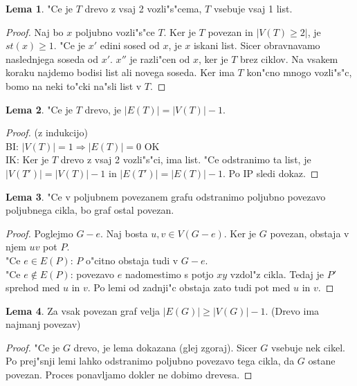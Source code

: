 \documentclass{article}
\theoremstyle{definition}
\newtheorem{lemma}{Lema}[section]
\begin{document}
	\begin{lemma}
		"Ce je $T$ drevo z vsaj 2 vozli"s"cema, $T$ vsebuje vsaj 1 list.
		\begin{proof}
			Naj bo $x$ poljubno vozli"s"ce $T$. Ker je $T$ povezan in $|V(T) \geq 2|$, je $st(x) \geq 1$. "Ce je $x'$ edini sosed od $x$, je $x$ iskani list. Sicer obravnavamo naslednjega soseda od $x'$. $x''$ je razli"cen od $x$, ker je $T$ brez ciklov. Na vsakem koraku najdemo bodisi list ali novega soseda. Ker ima $T$ kon"cno mnogo vozli"s"c, bomo na neki to"cki na"sli list v $T$.
		\end{proof}
	\end{lemma}
	\begin{lemma}
		"Ce je $T$ drevo, je $|E(T)| = |V(T)| - 1$.
		\begin{proof} (z indukcijo) \\
			BI: $|V(T)| = 1 \Rightarrow |E(T)| = 0$ OK \\
			IK:
			Ker je $T$ drevo z vsaj 2 vozli"s"ci, ima list. "Ce odstranimo ta list, je $|V(T')| = |V(T)| - 1$ in $|E(T')| = |E(T)| - 1$. Po IP sledi dokaz.
		\end{proof}
	\end{lemma}
	\begin{lemma}
		"Ce v poljubnem povezanem grafu odstranimo poljubno povezavo poljubnega cikla, bo graf ostal povezan.
		\begin{proof}
			Poglejmo $G-e$. Naj bosta $u,v \in V(G-e)$. Ker je $G$ povezan, obstaja v njem $uv$ pot $P$. \\
			"Ce $e \in E(P)$: $P$ o"citno obstaja tudi v $G-e$. \\
			"Ce $e \notin E(P)$: povezavo $e$ nadomestimo s potjo $xy$ vzdol"z cikla. Tedaj je $P'$ sprehod med $u$ in $v$. Po lemi od zadnji"c obstaja zato tudi pot med $u$ in $v$.
		\end{proof}
	\end{lemma}
	\begin{lemma}
		Za vsak povezan graf velja $|E(G)| \geq |V(G)|-1$. (Drevo ima najmanj povezav)
		\begin{proof}
			"Ce je $G$ drevo, je lema dokazana (glej zgoraj). Sicer $G$ vsebuje nek cikel. Po prej"snji lemi lahko odstranimo poljubno povezavo tega cikla, da $G$ ostane povezan. Proces ponavljamo dokler ne dobimo drevesa.
		\end{proof}
	\end{lemma}
\end{document}
